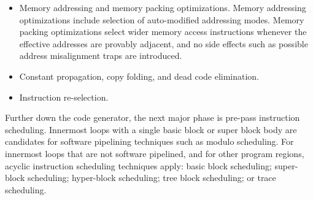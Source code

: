 \begin{itemize}
\item Memory addressing and memory packing optimizations. Memory addressing
optimizations include selection of auto-modified addressing modes. Memory
packing optimizations select wider memory access instructions whenever the
effective addresses are provably adjacent, and no side effects such as
possible address misalignment traps are introduced.

\item Constant propagation, copy folding, and dead code elimination.

\item Instruction re-selection.

\end{itemize} \medskip

Further down the code generator, the next major phase is pre-pass instruction
scheduling. Innermost loops with a single basic block or super block body are
candidates for software pipelining techniques such as modulo scheduling. For
innermost loops that are not software pipelined, and for other program regions,
acyclic instruction scheduling techniques apply: basic block scheduling;
super-block scheduling; hyper-block scheduling; tree block scheduling; or trace
scheduling.

